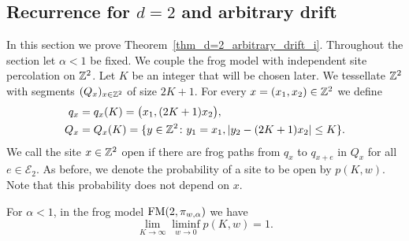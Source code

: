 \subsection*{Recurrence for $d = 2$ and arbitrary drift}

In this section we prove Theorem~\ref{thm_d=2_arbitrary_drift_i}. Throughout the section let $\alpha < 1$ be fixed.
We couple the frog model with independent site percolation on $\mathbb{Z}^2$. Let $K$ be an integer that will be chosen later. We tessellate $\mathbb{Z}^2$ with segments $(Q_x)_{x \in \mathbb{Z}^2}$ of size $2K+1$. For every $x = (x_1, x_2) \in \mathbb{Z}^2$ we define
\begin{align*}
 q_x &= q_x(K) = \bigl( x_1,  (2K+1)x_2\bigr), \\
 Q_x &= Q_x(K) = \{y \in \mathbb{Z}^2 \colon y_1 = x_1, \lvert y_2-(2K+1)x_2 \rvert \leq K\}.
\end{align*}
We call the site $x \in \mathbb{Z}^2$ open if there are frog paths from $q_x$ to $q_{x+e}$ in $Q_x$ for all $e \in \mathcal{E}_2$. As before, we denote the probability of a site to be open by $p(K,w)$. Note that this probability does not depend on $x$.

\begin{lemma}\label{lemma_d_2_arbitrary_drift_percolation_parameter_bound}
 For $\alpha <1$, in the frog model $\operatorname{FM}(2,\pi_{w,\alpha})$ we have
 \begin{equation*}
  \lim_{K \to \infty} \liminf_{w \to 0} p(K,w) =1.
 \end{equation*}
\end{lemma}

